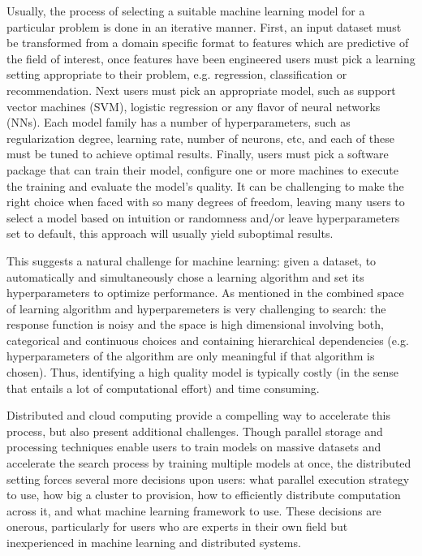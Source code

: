 \documentclass[journal]{IEEEtran}
\begin{document}
Usually, the process of selecting a suitable machine learning model for a particular problem is done in an iterative manner. First, an input dataset must be transformed from a domain specific format to features which are predictive of the field of interest, once features have been engineered users must pick a learning setting appropriate to their problem, e.g. regression, classification or recommendation. Next users must pick an appropriate model, such as support vector machines (SVM), logistic regression or any flavor of neural networks (NNs). Each model family has a number of hyperparameters, such as regularization degree, learning rate, number of neurons, etc, and each of these must be tuned to achieve optimal results. Finally, users must pick a software package that can train their model, configure one or more machines to execute the training and evaluate the model's quality. It can be challenging to make the right choice when faced with so many degrees of freedom, leaving many users to select a model based on intuition or randomness and/or leave hyperparameters set to default, this approach will usually yield suboptimal results.

This suggests a natural challenge for machine learning: given a dataset, to automatically and simultaneously chose a learning algorithm and set its hyperparameters to optimize performance. As mentioned in \cite{Hall2009} the combined space of learning algorithm and hyperparemeters is very challenging to search: the response function is noisy and the space is high dimensional involving both, categorical and continuous choices and containing hierarchical dependencies (e.g. hyperparameters of the algorithm are only meaningful if that algorithm is chosen). Thus, identifying a high quality model is typically costly (in the sense that entails a lot of computational effort) and time consuming.

Distributed and cloud computing provide a compelling way to accelerate this process, but also present additional challenges. Though parallel storage and processing techniques enable users to train models on massive datasets and accelerate the search process by training multiple models at once, the distributed setting forces several more decisions upon users: what parallel execution strategy to use, how big a cluster to provision, how to efficiently distribute computation across it, and what machine learning framework to use. These decisions are onerous, particularly for users who are experts in their own field but inexperienced in machine learning and distributed systems.
\end{document}
